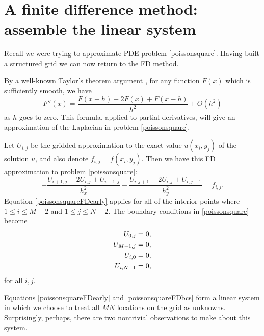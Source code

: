 \section{A finite difference method: assemble the linear system}

Recall we were trying to approximate PDE problem \eqref{poissonsquare}.  Having built a structured grid we can now return to the FD method.

By a well-known Taylor's theorem argument \citep{MortonMayers}, for any function $F(x)$ which is sufficiently smooth, we have
    $$F''(x) = \frac{F(x+h) - 2 F(x) + F(x-h)}{h^2} + O(h^2)$$
as $h$ goes to zero.  This formula, applied to partial derivatives, will give an approximation of the Laplacian in problem \eqref{poissonsquare}.

Let $U_{i,j}$ be the gridded approximation to the exact value $u(x_i,y_j)$ of the solution $u$,  and also denote $f_{i,j} = f(x_i,y_j)$.  Then we have this FD approximation to problem \eqref{poissonsquare}:
\begin{equation}
- \frac{U_{i+1,j} - 2 U_{i,j} + U_{i-1,j}}{h_x^2} - \frac{U_{i,j+1} - 2 U_{i,j} + U_{i,j-1}}{h_y^2} = f_{i,j}. \label{poissonsquareFDearly}
\end{equation}
Equation \eqref{poissonsquareFDearly} applies for all of the interior points where $1 \le i \le M-2$ and $1 \le j \le N-2$.  The boundary conditions in \eqref{poissonsquare} become
\begin{align}
U_{0,j} &= 0, \label{poissonsquareFDbcs} \\
U_{M-1,j} &= 0, \notag \\
U_{i,0} &= 0, \notag \\
U_{i,N-1} &= 0, \notag
\end{align}
for all $i,j$.

Equations \eqref{poissonsquareFDearly} and \eqref{poissonsquareFDbcs} form a linear system in which we choose to treat all $MN$ locations on the grid as unknowns.  Surprisingly, perhaps, there are two nontrivial observations to make about this system.  

